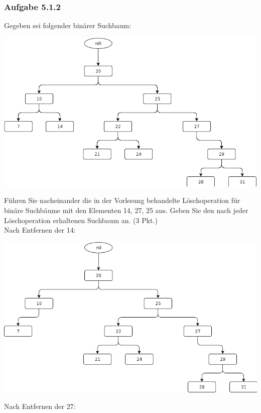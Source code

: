\documentclass{article}
\begin{document}
\subsubsection*{Aufgabe 5.1.2}
\label{sssec:5.1.2}
Gegeben sei folgender binärer Suchbaum:
\begin{center}
	\includegraphics[scale=0.5]{w5-ressourcen/5-1-2-0.png}
\end{center}
Führen Sie nacheinander die in der Vorlesung behandelte Löschoperation für binäre Suchbäume mit den Elementen 14, 27, 25 aus.
Geben Sie den nach jeder Löschoperation erhaltenen Suchbaum an. (3 Pkt.)
\vspace{1cm}\-\\
Nach Entfernen der 14:\\
\begin{center}
	\includegraphics[scale=0.5]{w5-ressourcen/5-1-2-1.png}
\end{center}
Nach Entfernen der 27:\\
\end{document}
